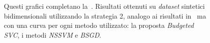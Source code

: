 \begin{appendices}
\begin{figure}[ht]
\begin{subfigure}{.8\textwidth}
    \end{subfigure}
 \caption[]{Questi grafici completano la~. Risultati ottenuti su \emph{dataset} sintetici bidimensionali utilizzando la strategia 2, analogo ai risultati in~ ma con una curva per ogni metodo utilizzato: la proposta \emph{Budgeted SVC}, i metodi \emph{NSSVM} e \emph{BSGD}.}

\end{figure}


\end{appendices}